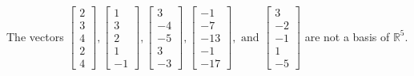 \begin{exercise}
\begin{exerciseStatement}
  \end{exerciseStatement}
  \begin{exerciseAnswer}
   The vectors \(\left[\begin{array}{r}
2 \\
3 \\
4 \\
2 \\
4
\end{array}\right] , \left[\begin{array}{r}
1 \\
3 \\
2 \\
1 \\
-1
\end{array}\right] , \left[\begin{array}{r}
3 \\
-4 \\
-5 \\
3 \\
-3
\end{array}\right] , \left[\begin{array}{r}
-1 \\
-7 \\
-13 \\
-1 \\
-17
\end{array}\right] , \text{ and } \left[\begin{array}{r}
3 \\
-2 \\
-1 \\
1 \\
-5
\end{array}\right]\) 
  	 are not  a basis of \(\mathbb{R}^5\).
  


  \end{exerciseAnswer}
\end{exercise}